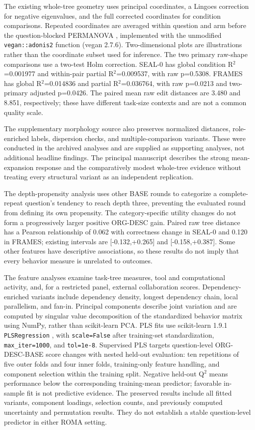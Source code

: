 \documentclass[10pt,letterpaper,twocolumn]{article}
\begin{document}
The existing whole-tree geometry uses principal coordinates, a Lingoes correction for negative eigenvalues, and the full corrected coordinates for condition comparisons. Repeated coordinates are averaged within question and arm before the question-blocked PERMANOVA \cite{anderson}, implemented with the unmodified \nolinkurl{vegan::adonis2} function (vegan 2.7.6). Two-dimensional plots are illustrations rather than the coordinate subset used for inference. The two primary raw-shape comparisons use a two-test Holm correction. SEAL-0 has global condition R$^2$=0.001977 and within-pair partial R$^2$=0.009537, with raw p=0.5308. FRAMES has global R$^2$=0.014836 and partial R$^2$=0.036764, with raw p=0.0213 and two-primary adjusted p=0.0426. The paired mean raw edit distances are 3.480 and 8.851, respectively; these have different task-size contexts and are not a common quality scale.


The supplementary morphology source also preserves normalized distances, role-enriched labels, dispersion checks, and multiple-comparison variants. These were conducted in the archived analyses and are supplied as supporting analyses, not additional headline findings. The principal manuscript describes the strong mean-expansion response and the comparatively modest whole-tree evidence without treating every structural variant as an independent replication.


The depth-propensity analysis uses other BASE rounds to categorize a complete-repeat question's tendency to reach depth three, preventing the evaluated round from defining its own propensity. The category-specific utility changes do not form a progressively larger positive ORG-DESC gain. Paired raw tree distance has a Pearson relationship of 0.062 with correctness change in SEAL-0 and 0.120 in FRAMES; existing intervals are [-0.132,+0.265] and [-0.158,+0.387]. Some other features have descriptive associations, so these results do not imply that every behavior measure is unrelated to outcomes.


The feature analyses examine task-tree measures, tool and computational activity, and, for a restricted panel, external collaboration scores. Dependency-enriched variants include dependency density, longest dependency chain, local parallelism, and fan-in. Principal components describe joint variation and are computed by singular value decomposition of the standardized behavior matrix using NumPy, rather than scikit-learn PCA. PLS fits use scikit-learn 1.9.1 \nolinkurl{PLSRegression} \cite{sklearn}, with \nolinkurl{scale=False} after training-set standardization, \nolinkurl{max_iter=1000}, and \nolinkurl{tol=1e-8}. Supervised PLS targets question-level ORG-DESC-BASE score changes with nested held-out evaluation: ten repetitions of five outer folds and four inner folds, training-only feature handling, and component selection within the training split. Negative held-out Q$^2$ means performance below the corresponding training-mean predictor; favorable in-sample fit is not predictive evidence. The preserved results include all fitted variants, component loadings, selection counts, and previously computed uncertainty and permutation results. They do not establish a stable question-level predictor in either ROMA setting.
\end{document}
